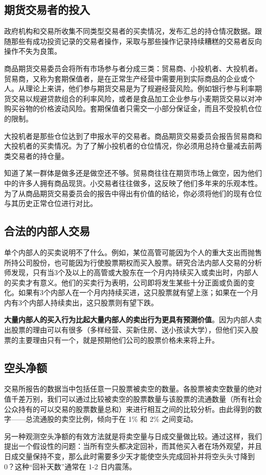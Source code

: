 \subsection*{期货交易者的投入}
政府机构和交易所收集不同类型交易者的买卖情况，发布汇总的持仓情况数据。跟随那些有成功投资记录的交易者操作，采取与那些操作记录持续糟糕的交易者反向操作不失为良策。

商品期货交易委员会将所有市场参与者分成三类：贸易商、小投机者、大投机者。贸易商，又称为套期保值者，是在正常生产经营中需要用到实际商品的企业或个人。从理论上来讲，他们参与期货交易是为了规避经营风险。例如银行参与利率期货交易以规避贷款组合的利率风险，或者是食品加工企业参与小麦期货交易以对冲购买谷物的价格波动风险。套期保值者只需交一小部分保证金，而且不受投机仓位的限制。

大投机者是那些仓位达到了申报水平的交易者。商品期货交易委员会报告贸易商和大投机者的买卖情况。为了了解小投机者的仓位情况，你必须用总持仓量减去前两类交易者的持仓量。

知道了某一群体是做多还是做空还不够。贸易商往往在期货市场上做空，因为他们中的许多人拥有商品现货。小交易者往往做多，这反映了他们多年来的乐观本性。为了从商品期货交易委员会的报告中得出有价值的结论，你必须将他们的现有仓位与其历史正常仓位进行对比。
\subsection*{合法的内部人交易}
单个内部人的买卖说明不了什么。例如，某位高管可能因为个人的重大支出而抛售所持公司股份，也可能因为行使股票期权而买入股票。研究合法内部人交易的分析师发现，只有当3个及以上的高管或大股东在一个月内持续买入或卖出时，内部人的买卖才有意义。他们的买卖行为表明，公司即将发生某些十分正面或负面的变化。如果有3个内部人在一个月内持续买进，这只股票就有望上涨；如果在一个月内有3个内部人持续卖出，这只股票则有望下跌。

\textbf{大量内部人的买入行为比起大量内部人的卖出行为更具有预测价值}。因为内部人卖出股票的理由可以有很多（多样经营、买新住房、送小孩读大学），但他们买入股票的主要理由只有一个，就是预期他们公司的股票价格未来将上升。
\subsection*{空头净额}
交易所报告的数据当中包括任意一只股票被卖空的数量。各股票被卖空数量的绝对值千差万别，我们可以通过比较被卖空的股票数量与该股票的流通数量（所有社会公众持有的可以交易的股票数量总和）来进行相互之间的比较分析。由此得到的数字——总流通股的卖空比例，倾向于在 1\% 和 2\% 之间变动。

另一种观测空头净额的有效方法就是将卖空量与日成交量做比较。通过这样，我们提出一个假设性的问题：当所有空头都决定回补，而其他买入者在场外观望，并且日成交量保持不变，那么此时需要多少天才能使空头完成回补并将空头头寸降到 0？这种“回补天数”通常在 1-2 日内震荡。

